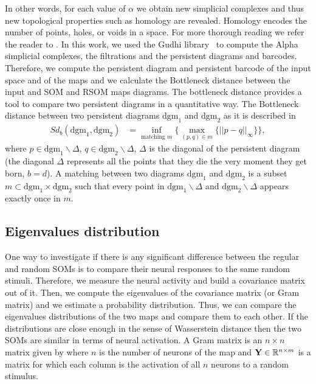 In other words, for each value of $\alpha$ we obtain new simplicial
complexes and thus new topological properties such as homology are
revealed. Homology encodes the number of points, holes, or voids in a
space.  For more thorough reading we refer the reader to
\citep{Chazal:2017,Ghrist:2008,Zomorodian:2005}. In this work, we used
the Gudhi library~\citep{Maria:2014} to compute the Alpha simplicial
complexes, the filtrations and the persistent diagrams and
barcodes. Therefore, we compute the persistent diagram and persistent
barcode of the input space and of the maps and we calculate the
Bottleneck distance between the input and SOM and RSOM maps
diagrams. The bottleneck distance provides a tool to compare two
persistent diagrams in a quantitative way.  The Bottleneck distance
between two persistent diagrams $\text{dgm}_1$ and $\text{dgm}_2$ as
it is described in~\cite{Chazal:2017}
\begin{align}S
    \label{eq:bottle}
    d_b(\text{dgm}_1, \text{dgm}_2) &= \inf_{\text{matching }m}\{ \max_{(p, q) \in m} \{||p - q||_{\infty} \} \},
\end{align}
where $p \in \text{dgm}_1 \backslash \Delta$, $q \in \text{dgm}_2
\backslash \Delta$, $\Delta$ is the diagonal of the persistent diagram
(the diagonal $\Delta$ represents all the points that they die the
very moment they get born, $b = d$). A matching between two diagrams
$\text{dgm}_1$ and $\text{dgm}_2$ is a subset $m \subset \text{dgm}_1
\times \text{dgm}_2$ such that every point in $\text{dgm}_1 \backslash
\Delta$ and $\text{dgm}_2 \backslash \Delta$ appears exactly once in $m$.


\subsection{Eigenvalues distribution}
\label{sec:dist}

One way to investigate if there is any significant difference between the regular and random SOMs is to compare their neural responses to the same random stimuli. Therefore, we measure the neural activity and build a covariance matrix out of it. Then, we compute the eigenvalues of the covariance matrix (or Gram matrix) and we estimate a probability distribution. Thus, we can compare the eigenvalues distributions of the two maps and compare them to each other. If the distributions are close enough in the sense of Wasserstein distance then the two SOMs are similar in terms of neural activation.  A Gram matrix is an $n \times n$ matrix given by where $n$ is the number of neurons of the map and ${\bf Y} \in \mathbb{R}^{n \times m}$ is a matrix for which each column is the activation of all $n$ neurons to a random stimulus.

